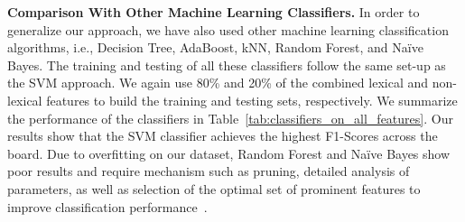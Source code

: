 \documentclass[twocolumn,10pt,letterpaper]{article}
\newcommand{\descr}[1]{\smallskip\noindent\textbf{#1}}
\begin{document}
\begin{table*}[!t]
\tabcolsep=0.11cm
  \begin{center}
\vspace{-0.15cm}
    \caption{F1-Score obtained with different classification methods, using both lexical and non-lexical features, in detecting like farm users.}
%
    \label{tab:classifiers_on_all_features}
      \end{center}
\end{table*}


\descr{Comparison With Other Machine Learning Classifiers.}
In order to generalize our approach, we have also used other machine learning classification algorithms, i.e., Decision Tree, AdaBoost, kNN, Random Forest, and Na\"ive Bayes. The training and testing of all these classifiers follow the same set-up as the SVM approach. We again use 80\% and 20\% of the combined lexical and non-lexical features to build the training and testing sets, respectively. We summarize the performance of the classifiers in Table~\ref{tab:classifiers_on_all_features}.  Our results show that the SVM classifier achieves the highest F1-Scores across the board. Due to overfitting on our dataset, Random Forest and Na\"ive Bayes show poor results and require mechanism such as pruning, detailed analysis of parameters, as well as selection of the optimal set of prominent features to improve classification performance~\cite{kohavi1995feature,Breiman:rf}.
\end{document}
